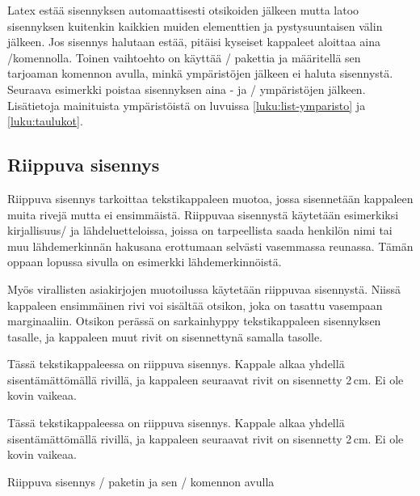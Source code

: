 Latex estää sisennyksen automaattisesti otsikoiden jälkeen mutta latoo
sisennyksen kuitenkin kaikkien muiden elementtien ja pystysuuntaisen
välin jälkeen. Jos sisennys halutaan estää, pitäisi kyseiset kappaleet
aloittaa aina \-/komennolla. Toinen vaihtoehto on
käyttää \-/ pakettia ja
määritellä sen tarjoaman komennon avulla, minkä ympäristöjen jälkeen ei
haluta sisennystä. Seuraava esimerkki poistaa sisennyksen aina
- ja \-/ ympäristöjen jälkeen.
Lisätietoja mainituista ympäristöistä on luvuissa
\ref{luku:list-ymparisto} ja \ref{luku:taulukot}.

\begin{koodilohkosis}
\end{koodilohkosis}

\subsection{Riippuva sisennys}
\label{luku:riippuva_sisennys}

Riippuva sisennys tarkoittaa tekstikappaleen muotoa, jossa sisennetään
kappaleen muita rivejä mutta ei ensimmäistä. Riippuvaa sisennystä
käytetään esimerkiksi kirjallisuus\-/{} ja lähdeluetteloissa, joissa on
tarpeellista saada henkilön nimi tai muu lähdemerkinnän hakusana
erottumaan selvästi vasemmassa reunassa. Tämän oppaan lopussa sivulla
\pageref{luku:kirjallisuutta} on esimerkki lähdemerkinnöistä.

Myös virallisten asiakirjojen muotoilussa käytetään riippuvaa
sisennystä. Niissä kappaleen ensimmäinen rivi voi sisältää otsikon, joka
on tasattu vasempaan marginaaliin. Otsikon perässä on sarkainhyppy
tekstikappaleen sisennyksen tasalle, ja kappaleen muut rivit on
sisennettynä samalla tasolle.

\begin{esimerkki*}
  \komentoi{,}

\begin{koodilohko}
  Tässä tekstikappaleessa on riippuva sisennys. Kappale
  alkaa yhdellä sisentämättömällä rivillä, ja kappaleen seuraavat rivit
  on sisennetty 2\,cm. Ei ole kovin vaikeaa.
\end{koodilohko}
\begin{tulos}
  Tässä tekstikappaleessa on riippuva sisennys. Kappale
  alkaa yhdellä sisentämättömällä rivillä, ja kappaleen seuraavat rivit
  on sisennetty 2\,cm. Ei ole kovin vaikeaa.
\end{tulos}
\caption{Riippuva sisennys \-/ paketin ja sen
  \-/ komennon avulla}
\label{esim:riippuva_sis_hangpara}
\end{esimerkki*}

